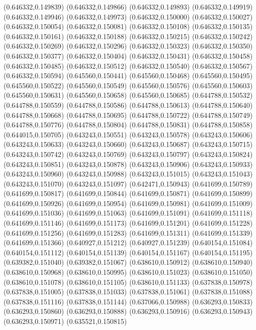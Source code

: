 (0.646332,0.149839)
(0.646332,0.149866)
(0.646332,0.149893)
(0.646332,0.149919)
(0.646332,0.149946)
(0.646332,0.149973)
(0.646332,0.150000)
(0.646332,0.150027)
(0.646332,0.150054)
(0.646332,0.150081)
(0.646332,0.150108)
(0.646332,0.150135)
(0.646332,0.150161)
(0.646332,0.150188)
(0.646332,0.150215)
(0.646332,0.150242)
(0.646332,0.150269)
(0.646332,0.150296)
(0.646332,0.150323)
(0.646332,0.150350)
(0.646332,0.150377)
(0.646332,0.150404)
(0.646332,0.150431)
(0.646332,0.150458)
(0.646332,0.150485)
(0.646332,0.150512)
(0.646332,0.150540)
(0.646332,0.150567)
(0.646332,0.150594)
(0.645560,0.150441)
(0.645560,0.150468)
(0.645560,0.150495)
(0.645560,0.150522)
(0.645560,0.150549)
(0.645560,0.150576)
(0.645560,0.150603)
(0.645560,0.150631)
(0.645560,0.150658)
(0.645560,0.150685)
(0.644788,0.150532)
(0.644788,0.150559)
(0.644788,0.150586)
(0.644788,0.150613)
(0.644788,0.150640)
(0.644788,0.150668)
(0.644788,0.150695)
(0.644788,0.150722)
(0.644788,0.150749)
(0.644788,0.150776)
(0.644788,0.150804)
(0.644788,0.150831)
(0.644788,0.150858)
(0.644015,0.150705)
(0.643243,0.150551)
(0.643243,0.150578)
(0.643243,0.150606)
(0.643243,0.150633)
(0.643243,0.150660)
(0.643243,0.150687)
(0.643243,0.150715)
(0.643243,0.150742)
(0.643243,0.150769)
(0.643243,0.150797)
(0.643243,0.150824)
(0.643243,0.150851)
(0.643243,0.150878)
(0.643243,0.150906)
(0.643243,0.150933)
(0.643243,0.150960)
(0.643243,0.150988)
(0.643243,0.151015)
(0.643243,0.151043)
(0.643243,0.151070)
(0.643243,0.151097)
(0.642471,0.150943)
(0.641699,0.150789)
(0.641699,0.150817)
(0.641699,0.150844)
(0.641699,0.150871)
(0.641699,0.150899)
(0.641699,0.150926)
(0.641699,0.150954)
(0.641699,0.150981)
(0.641699,0.151009)
(0.641699,0.151036)
(0.641699,0.151063)
(0.641699,0.151091)
(0.641699,0.151118)
(0.641699,0.151146)
(0.641699,0.151173)
(0.641699,0.151201)
(0.641699,0.151228)
(0.641699,0.151256)
(0.641699,0.151283)
(0.641699,0.151311)
(0.641699,0.151339)
(0.641699,0.151366)
(0.640927,0.151212)
(0.640927,0.151239)
(0.640154,0.151084)
(0.640154,0.151112)
(0.640154,0.151139)
(0.640154,0.151167)
(0.640154,0.151195)
(0.639382,0.151040)
(0.639382,0.151067)
(0.638610,0.150912)
(0.638610,0.150940)
(0.638610,0.150968)
(0.638610,0.150995)
(0.638610,0.151023)
(0.638610,0.151050)
(0.638610,0.151078)
(0.638610,0.151105)
(0.638610,0.151133)
(0.637838,0.150978)
(0.637838,0.151005)
(0.637838,0.151033)
(0.637838,0.151061)
(0.637838,0.151088)
(0.637838,0.151116)
(0.637838,0.151144)
(0.637066,0.150988)
(0.636293,0.150833)
(0.636293,0.150860)
(0.636293,0.150888)
(0.636293,0.150916)
(0.636293,0.150943)
(0.636293,0.150971)
(0.635521,0.150815)
